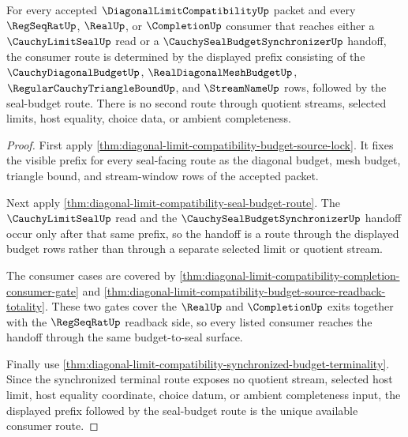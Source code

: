 \begin{theorem}
\label{thm:diagonal-limit-compatibility-budget-seal-handoff-determinacy}
For every accepted $\DiagonalLimitCompatibilityUp$ packet and every $\RegSeqRatUp$, $\RealUp$, or $\CompletionUp$ consumer that reaches either a $\CauchyLimitSealUp$ read or a $\CauchySealBudgetSynchronizerUp$ handoff, the consumer route is determined by the displayed prefix consisting of the $\CauchyDiagonalBudgetUp$, $\RealDiagonalMeshBudgetUp$, $\RegularCauchyTriangleBoundUp$, and $\StreamNameUp$ rows, followed by the seal-budget route. There is no second route through quotient streams, selected limits, host equality, choice data, or ambient completeness.
\end{theorem}
\begin{proof}
First apply \autoref{thm:diagonal-limit-compatibility-budget-source-lock}. It fixes the visible prefix for every seal-facing route as the diagonal budget, mesh budget, triangle bound, and stream-window rows of the accepted packet.

Next apply \autoref{thm:diagonal-limit-compatibility-seal-budget-route}. The $\CauchyLimitSealUp$ read and the $\CauchySealBudgetSynchronizerUp$ handoff occur only after that same prefix, so the handoff is a route through the displayed budget rows rather than through a separate selected limit or quotient stream.

The consumer cases are covered by \autoref{thm:diagonal-limit-compatibility-completion-consumer-gate} and \autoref{thm:diagonal-limit-compatibility-budget-source-readback-totality}. These two gates cover the $\RealUp$ and $\CompletionUp$ exits together with the $\RegSeqRatUp$ readback side, so every listed consumer reaches the handoff through the same budget-to-seal surface.

Finally use \autoref{thm:diagonal-limit-compatibility-synchronized-budget-terminality}. Since the synchronized terminal route exposes no quotient stream, selected host limit, host equality coordinate, choice datum, or ambient completeness input, the displayed prefix followed by the seal-budget route is the unique available consumer route.
\end{proof}
